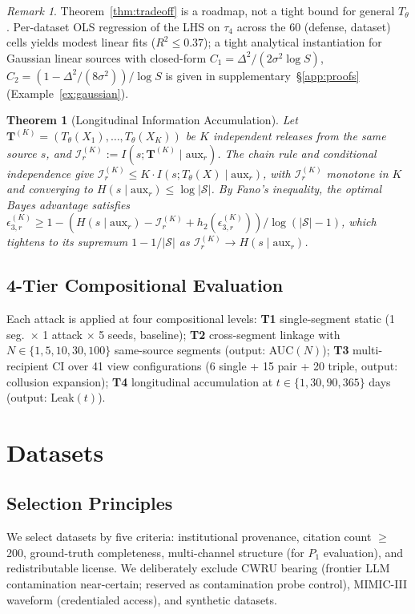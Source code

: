 \documentclass{article}
\newtheorem{theorem}{Theorem}
\theoremstyle{remark}
\newtheorem*{remark}{Remark}
\begin{document}
\begin{remark}
Theorem~\ref{thm:tradeoff} is a roadmap, not a tight bound for general $T_\theta$. Per-dataset OLS regression of the LHS on $\tau_4$ across the 60 (defense, dataset) cells yields modest linear fits ($R^2 \le 0.37$); a tight analytical instantiation for Gaussian linear sources with closed-form $C_1 = \Delta^2 / (2\sigma^2 \log S)$, $C_2 = (1 - \Delta^2/(8\sigma^2)) / \log S$ is given in supplementary~\S\ref{app:proofs} (Example~\ref{ex:gaussian}).
\end{remark}

\begin{theorem}[Longitudinal Information Accumulation]
\label{thm:longitudinal}
Let $\mathbf{T}^{(K)} = (T_\theta(X_1), \ldots, T_\theta(X_K))$ be $K$ independent releases from the same source $s$, and $\mathcal{I}^{(K)}_r := I(s; \mathbf{T}^{(K)} \mid \mathrm{aux}_r)$. The chain rule and conditional independence give $\mathcal{I}^{(K)}_r \le K \cdot I(s; T_\theta(X) \mid \mathrm{aux}_r)$, with $\mathcal{I}^{(K)}_r$ monotone in $K$ and converging to $H(s \mid \mathrm{aux}_r) \le \log|\mathcal{S}|$. By Fano's inequality, the optimal Bayes advantage satisfies $\epsilon_{3,r}^{(K)} \ge 1 - (H(s \mid \mathrm{aux}_r) - \mathcal{I}^{(K)}_r + h_2(\epsilon_{3,r}^{(K)})) / \log(|\mathcal{S}|-1)$, which tightens to its supremum $1 - 1/|\mathcal{S}|$ as $\mathcal{I}^{(K)}_r \to H(s \mid \mathrm{aux}_r)$.
\end{theorem}

\subsection{4-Tier Compositional Evaluation}
\label{sec:tiers}
Each attack is applied at four compositional levels: \textbf{T1} single-segment static (1 seg.\ $\times$ 1 attack $\times$ 5 seeds, baseline); \textbf{T2} cross-segment linkage with $N \in \{1, 5, 10, 30, 100\}$ same-source segments (output: AUC$(N)$); \textbf{T3} multi-recipient CI over 41 view configurations (6 single + 15 pair + 20 triple, output: collusion expansion); \textbf{T4} longitudinal accumulation at $t \in \{1, 30, 90, 365\}$ days (output: Leak$(t)$).

\section{Datasets}
\label{sec:datasets}

\subsection{Selection Principles}
We select datasets by five criteria: institutional provenance, citation count $\ge$ 200, ground-truth completeness, multi-channel structure (for $P_1$ evaluation), and redistributable license. We deliberately exclude CWRU bearing (frontier LLM contamination near-certain; reserved as contamination probe control), MIMIC-III waveform (credentialed access), and synthetic datasets.
\end{document}
